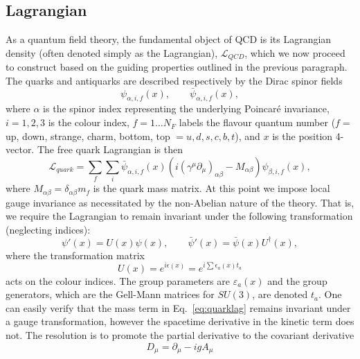 \documentclass[11pt, a4paper, twoside]{book}
\newcommand{\brac}[1] {\!\left(#1\right)}
\begin{document}
\subsection{Lagrangian}
\label{sec:QCDLagr}
As a quantum field theory, the fundamental object of QCD is its Lagrangian density (often denoted simply as the Lagrangian), \(\mathcal{L}_{QCD}\), which we now proceed to construct based on the guiding properties outlined in the previous paragraph. The quarks and antiquarks are described respectively by the Dirac spinor fields 
\begin{equation}
\psi_{\alpha,i,f}\brac{x}, \quad\quad \bar{\psi}_{\alpha,i,f}\brac{x},
\end{equation} 
where \(\alpha\) is the spinor index representing the underlying Poincar\'e invariance, \(i=1,2,3\) is the colour index, \(f=1\ldots N_{F}\) labels the flavour quantum number (\(f=\) up, down, strange, charm, bottom, top \(=u,d,s,c,b,t\)), and \(x\) is the position 4-vector. The free quark Lagrangian is then
\begin{equation}
\label{eq:quarklag}
\mathcal{L}_{quark}=\sum_{f}\sum_{i}\bar{\psi}_{\alpha,i,f}\brac{x}\brac{i\brac{\gamma^{\mu}\partial_{\mu}}_{\alpha\beta}-M_{\alpha\beta}}\psi_{\beta,i,f}\brac{x},
\end{equation}
where \(M_{\alpha\beta}=\delta_{\alpha\beta}m_f\) is the quark mass matrix. At this point we impose local gauge invariance as necessitated by the non-Abelian nature of the theory. That is, we require the Lagrangian to remain invariant under the following transformation (neglecting indices):
\begin{equation}
\psi '\brac{x}=U\brac{x}\psi\brac{x},\quad\quad\bar{\psi}'\brac{x}=\bar{\psi}\brac{x}U^\dagger\brac{x},
\end{equation}
where the transformation matrix 
\begin{equation}
U\brac{x}=e^{i\epsilon\left(x\right)}=e^{i\sum\epsilon_a\brac{x} t_a}
\end{equation}
acts on the colour indices. The group parameters are \(\varepsilon_a\brac{x}\) and the group generators, which are the Gell-Mann matrices for \(SU\brac{3}\), are denoted \(t_a\). One can easily verify that the mass term in Eq.~\eqref{eq:quarklag} remains invariant under a gauge transformation, however the spacetime derivative in the kinetic term does not. The resolution is to promote the partial derivative to the covariant derivative 
\begin{equation}
D_\mu=\partial_\mu-igA_\mu
\end{equation}
\end{document}
